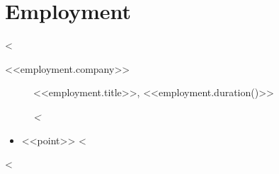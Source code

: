 \section{Employment}
<%
\begin{description}
    \item [<<employment.company>>] <<employment.title>>, <<employment.duration()>>
    \item [] \footnotesize\textsl{
    <%
    }
\end{description}
\begin{itemize}[leftmargin=0.05\textwidth]
    <%
    \item <<point>>
    <%
\end{itemize}
<%